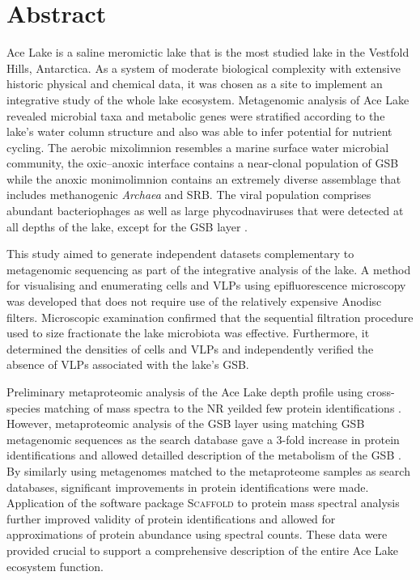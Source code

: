 \section{Abstract}
Ace Lake is a saline meromictic lake that is the most studied lake in the Vestfold Hills, Antarctica.
As a system of moderate biological complexity with extensive historic physical and chemical data, it was chosen as a site to implement an integrative study of the whole lake ecosystem.
Metagenomic analysis of Ace Lake revealed microbial taxa and metabolic genes were stratified according to the lake's water column structure and also was able to infer potential for nutrient cycling.
The aerobic mixolimnion resembles a marine surface water microbial community, the oxic--anoxic interface contains a near-clonal population of \ac{GSB} while the anoxic monimolimnion contains an extremely diverse assemblage that includes methanogenic \emph{Archaea} and \ac{SRB}.
The viral population comprises abundant bacteriophages as well as large phycodnaviruses that were detected at all depths of the lake, except for the \ac{GSB} layer \cite{Lauro2011}.

This study aimed to generate independent datasets complementary to metagenomic sequencing as part of the integrative analysis of the lake.
A method for visualising and enumerating cells and \acp{VLP} using epifluorescence microscopy was developed that does not require use of the relatively expensive Anodisc filters.
Microscopic examination confirmed that the sequential filtration procedure used to size fractionate the lake microbiota was effective. 
Furthermore, it determined the densities of cells and \acp{VLP} and independently verified the absence of \acp{VLP} associated with the lake's \ac{GSB}.

Preliminary metaproteomic analysis of the Ace Lake depth profile using cross-species matching of mass spectra to the \ac{NR} yeilded few protein identifications \cite{Ng2010b}.
However, metaproteomic analysis of the \ac{GSB} layer using matching \ac{GSB} metagenomic sequences as the search database gave a 3-fold increase in protein identifications and allowed detailled description of the metabolism of the \ac{GSB} \cite{Ng2010a,Ng2010b}.
By similarly using metagenomes matched to the metaproteome samples as search databases, significant improvements in protein identifications were made.
Application of the software package \textsc{Scaffold} to protein mass spectral analysis further improved validity of protein identifications and allowed for approximations of protein abundance using spectral counts.
These data were provided crucial to support a comprehensive description of the  entire Ace Lake ecosystem function. 

